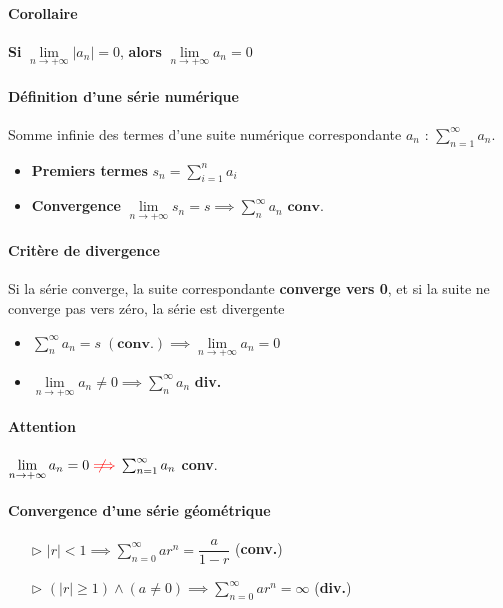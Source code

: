 \documentclass[2pt]{report}
\newcommand{\notimplies}{%
  \mathrel{{\ooalign{\hidewidth$\not\phantom{=}$\hidewidth\cr$\implies$}}}}
\begin{document}
\begin{multicols*}{3}
    \paragraph{Corollaire}
         \textbf{Si} $\lim\limits_{n\to+\infty }|a_n|  = 0$, 
         \textbf{alors}      
         $\lim\limits_{n\to+\infty }a_n  = 0$

    \paragraph{Définition d'une série numérique}
    Somme infinie des termes d'une suite numérique 
    correspondante $a_n$ : 
    $\sum_{n=1}^{\infty}a_n$. 
    \begin{itemize}
        \item \textbf{Premiers termes} $s_n = \sum_{i=1}^{n } a_i$   
        \item \textbf{Convergence}   
        $\lim\limits_{n\to+\infty }s_n  = s \implies 
        \sum_{n}^{\infty}a_n \textbf{ conv.}$
    \end{itemize}



    \paragraph{Critère de divergence}
        Si la série converge, la suite correspondante 
        \textbf{converge vers 0},
        et si la suite ne converge pas vers zéro, la série 
            est divergente
        \begin{itemize} 
            \item $\sum_ {n}^{ \infty }a_n = s \; (\textbf{conv.}) 
                \implies 
            \lim\limits_{n\to+\infty }a_n  = 0$
            \item
            $\lim\limits_{n\to+\infty }a_n  \neq 0  
            \implies 
            \sum_{ n}^{\infty }a_n$ \textbf{ div.}  
        \end{itemize}

    \paragraph{Attention} 
    $\lim\limits_{n\to+\infty }a_n = 0 
    \textcolor{red}{\notimplies} 
    \sum_{n=1}^{\infty }a_n$ \textbf{conv}.   



    \paragraph{Convergence d'une série géométrique}
    \begin{itemize}
        \item[$\rhd$] 
            $|r| < 1 \implies  
            \sum_{n=0}^{\infty }ar^{n} = 
            \dfrac{a}{1 - r} $ \;\;(\textbf{conv.})  
        \item [$\rhd$] 
            $(|r| \geq 1) \land (a \neq 0) \implies 
            \sum_{n=0}^{\infty }ar^{n} = \infty$ 
            (\textbf{div.})
        

\end{itemize}
\end{multicols*}
\end{document}
